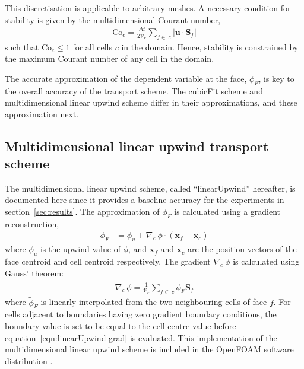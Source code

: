 This discretisation is applicable to arbitrary meshes.  A necessary condition for stability is given by the multidimensional Courant number,
\begin{align}
	\mathrm{Co}_c = \frac{\Delta t}{2 \mathcal{V}_c} \sum_{f \in\: c} \lvert \mathbf{u} \cdot \mathbf{S}_f \rvert \label{eqn:co}
\end{align}
such that $\mathrm{Co}_c \leq 1$ for all cells $c$ in the domain.  Hence, stability is constrained by the maximum Courant number of any cell in the domain.

The accurate approximation of the dependent variable at the face, $\phi_F$, is key to the overall accuracy of the transport scheme. The cubicFit scheme and multidimensional linear upwind scheme differ in their approximations, and these approximation  next.




\subsection{Multidimensional linear upwind transport scheme}
The multidimensional linear upwind scheme, called ``linearUpwind'' hereafter, is documented here since it provides a baseline accuracy for the experiments in section~\ref{sec:results}.  The approximation of $\phi_F$ is calculated using a gradient reconstruction,
\begin{align}
	\phi_F &= \phi_u + \nabla_c\: \phi \cdot \left(\mathbf{x}_f - \mathbf{x}_c \right)
\end{align} 
where $\phi_u$ is the upwind value of $\phi$, and $\mathbf{x}_f$ and $\mathbf{x}_c$ are the position vectors of the face centroid and cell centroid respectively.
The gradient $\nabla_c \:\phi$ is calculated using Gauss' theorem:
\begin{align}
	\nabla_c\: \phi = \frac{1}{\mathcal{V}_c} \sum_{f\in\:c} \widetilde{\phi}_F \mathbf{S}_f \label{eqn:linearUpwind-grad}
\end{align}
where $\widetilde{\phi}_F$ is linearly interpolated from the two neighbouring cells of face $f$.  For cells adjacent to boundaries having zero gradient boundary conditions, the boundary value is set to be equal to the cell centre value before equation~\eqref{eqn:linearUpwind-grad} is evaluated.
This implementation of the multidimensional linear upwind scheme is included in the OpenFOAM software distribution \citep{openfoam}.

